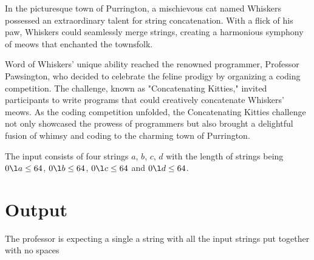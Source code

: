 In the picturesque town of Purrington, a mischievous cat named Whiskers possessed an extraordinary talent for string concatenation. With a flick of his paw, Whiskers could seamlessly merge strings, creating a harmonious symphony of meows that enchanted the townsfolk.

Word of Whiskers' unique ability reached the renowned programmer, Professor Pawsington, who decided to celebrate the feline prodigy by organizing a coding competition. The challenge, known as "Concatenating Kitties," invited participants to write programs that could creatively concatenate Whiskers' meows. As the coding competition unfolded, the Concatenating Kitties challenge not only showcased the prowess of programmers but also brought a delightful fusion of whimsy and coding to the charming town of Purrington.

\begin{Input}
The input consists of four strings $a$, $b$, $c$, $d$ with the length of strings being
$0\l a\leq 64$,
$0\l b\leq 64$, 
$0\l c\leq 64$ and
$0\l d\leq 64$.
\end{Input}

\section*{Output}
The professor is expecting a single a string with all the input strings put together with no spaces
